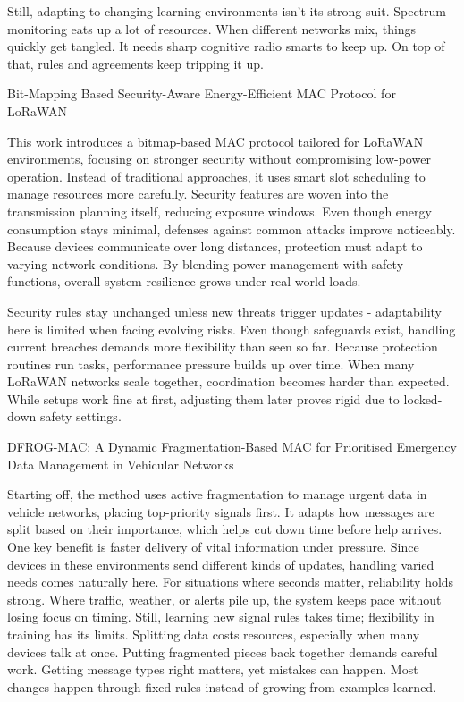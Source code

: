 \documentclass[a4paper,fleqn]{cas-dc}
\numberwithin{equation}{section}
\begin{document}
Still, adapting to changing learning environments isn’t its strong suit. Spectrum monitoring eats up a lot of resources. When different networks mix, things quickly get tangled. It needs sharp cognitive radio smarts to keep up. On top of that, rules and agreements keep tripping it up.\cite{Chen2025}

 Bit-Mapping Based Security-Aware Energy-Efficient MAC Protocol for LoRaWAN

This work introduces a bitmap-based MAC protocol tailored for LoRaWAN environments, focusing on stronger security without compromising low-power operation. Instead of traditional approaches, it uses smart slot scheduling to manage resources more carefully. Security features are woven into the transmission planning itself, reducing exposure windows. Even though energy consumption stays minimal, defenses against common attacks improve noticeably. Because devices communicate over long distances, protection must adapt to varying network conditions. By blending power management with safety functions, overall system resilience grows under real-world loads.



Security rules stay unchanged unless new threats trigger updates - adaptability here is limited when facing evolving risks. Even though safeguards exist, handling current breaches demands more flexibility than seen so far. Because protection routines run tasks, performance pressure builds up over time. When many LoRaWAN networks scale together, coordination becomes harder than expected. While setups work fine at first, adjusting them later proves rigid due to locked-down safety settings.\cite{TusharVikash202552497}

DFROG-MAC: A Dynamic Fragmentation-Based MAC for Prioritised Emergency Data Management in Vehicular Networks

Starting off, the method uses active fragmentation to manage urgent data in vehicle networks, placing top-priority signals first. It adapts how messages are split based on their importance, which helps cut down time before help arrives. One key benefit is faster delivery of vital information under pressure. Since devices in these environments send different kinds of updates, handling varied needs comes naturally here. For situations where seconds matter, reliability holds strong. Where traffic, weather, or alerts pile up, the system keeps pace without losing focus on timing. Still, learning new signal rules takes time; flexibility in training has its limits. Splitting data costs resources, especially when many devices talk at once. Putting fragmented pieces back together demands careful work. Getting message types right matters, yet mistakes can happen. Most changes happen through fixed rules instead of growing from examples learned\cite{Khan2025}.
\end{document}

